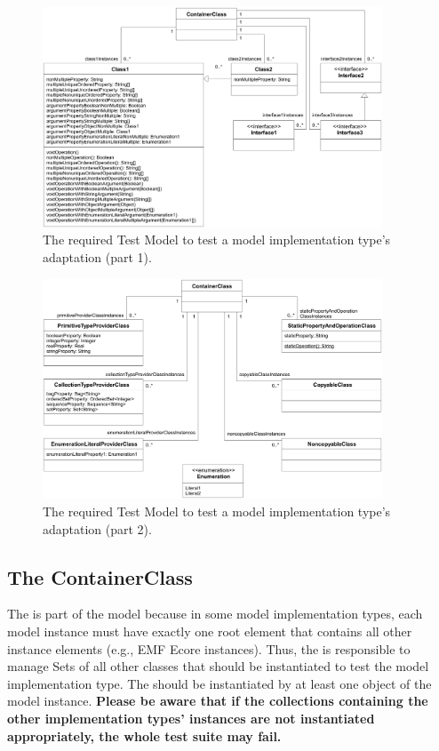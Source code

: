 \begin{figure}
	\includegraphics[width=0.9\textwidth]{figures/modelinstancetestsuite/testModel01.pdf}
	\caption{The required Test Model to test a model implementation type's adaptation (part 1).}
	\label{pic:modelinstancetestsuite:testModel1}
\end{figure}

\begin{figure}
  \includegraphics[width=0.9\textwidth]{figures/modelinstancetestsuite/testModel02.pdf}
	\caption{The required Test Model to test a model implementation type's adaptation (part 2).}
	\label{pic:modelinstancetestsuite:testModel2}
\end{figure}


\subsection{The ContainerClass}

The  is part of the model because in some model implementation types, each model instance must have exactly one root element that contains all other instance elements (e.g., EMF Ecore instances). Thus, the  is responsible to manage Sets of all other classes that should be instantiated to test the model implementation type. The  should be instantiated by at least one object of the model instance. \textbf{Please be aware that if the collections containing the other implementation types' instances are not instantiated appropriately, the whole test suite may fail.}


